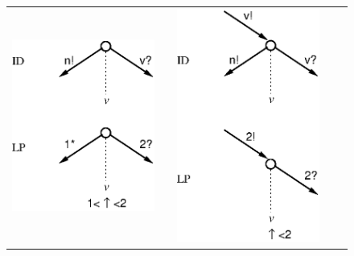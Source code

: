 \begin{figure}
\centering
\begin{tabular}{c c c c c}
\includegraphics[scale=0.7]{eps/csd_v1_fig}& 
\vspace{1cm} &
\includegraphics[scale=0.7]{eps/csd_v2_fig}& 

\end{tabular}
\end{figure}
